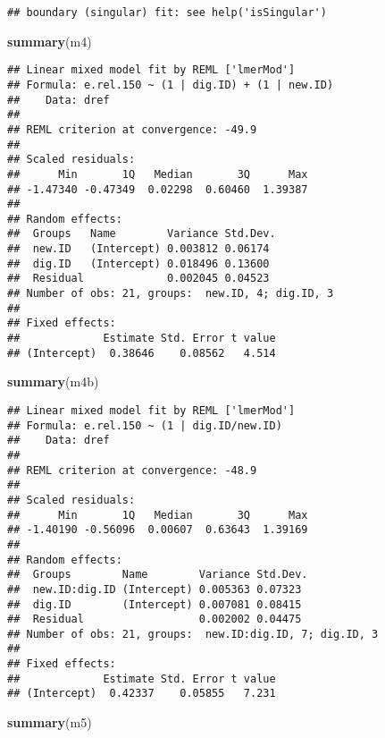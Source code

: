 \documentclass[
]{article}
\newenvironment{Shaded}{\begin{snugshade}}{\end{snugshade}}
\newcommand{\FunctionTok}[1]{\textcolor[rgb]{0.13,0.29,0.53}{\textbf{#1}}}
\newcommand{\NormalTok}[1]{#1}
\begin{document}
\begin{verbatim}
## boundary (singular) fit: see help('isSingular')
\end{verbatim}

\begin{Shaded}
\begin{Highlighting}[]
\FunctionTok{summary}\NormalTok{(m4)}
\end{Highlighting}
\end{Shaded}

\begin{verbatim}
## Linear mixed model fit by REML ['lmerMod']
## Formula: e.rel.150 ~ (1 | dig.ID) + (1 | new.ID)
##    Data: dref
## 
## REML criterion at convergence: -49.9
## 
## Scaled residuals: 
##      Min       1Q   Median       3Q      Max 
## -1.47340 -0.47349  0.02298  0.60460  1.39387 
## 
## Random effects:
##  Groups   Name        Variance Std.Dev.
##  new.ID   (Intercept) 0.003812 0.06174 
##  dig.ID   (Intercept) 0.018496 0.13600 
##  Residual             0.002045 0.04523 
## Number of obs: 21, groups:  new.ID, 4; dig.ID, 3
## 
## Fixed effects:
##             Estimate Std. Error t value
## (Intercept)  0.38646    0.08562   4.514
\end{verbatim}

\begin{Shaded}
\begin{Highlighting}[]
\FunctionTok{summary}\NormalTok{(m4b)}
\end{Highlighting}
\end{Shaded}

\begin{verbatim}
## Linear mixed model fit by REML ['lmerMod']
## Formula: e.rel.150 ~ (1 | dig.ID/new.ID)
##    Data: dref
## 
## REML criterion at convergence: -48.9
## 
## Scaled residuals: 
##      Min       1Q   Median       3Q      Max 
## -1.40190 -0.56096  0.00607  0.63643  1.39169 
## 
## Random effects:
##  Groups        Name        Variance Std.Dev.
##  new.ID:dig.ID (Intercept) 0.005363 0.07323 
##  dig.ID        (Intercept) 0.007081 0.08415 
##  Residual                  0.002002 0.04475 
## Number of obs: 21, groups:  new.ID:dig.ID, 7; dig.ID, 3
## 
## Fixed effects:
##             Estimate Std. Error t value
## (Intercept)  0.42337    0.05855   7.231
\end{verbatim}

\begin{Shaded}
\begin{Highlighting}[]
\FunctionTok{summary}\NormalTok{(m5)}
\end{Highlighting}
\end{Shaded}
\end{document}
